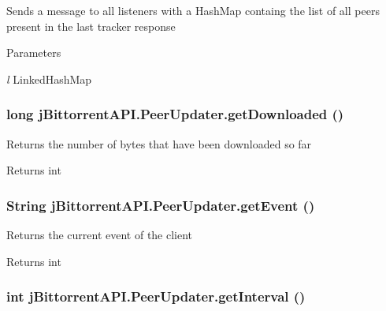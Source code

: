 \label{classj_bittorrent_a_p_i_1_1_peer_updater_a660e9bcab08ec687992ce4ae43a21078}
Sends a message to all listeners with a HashMap containg the list of all peers present in the last tracker response 
\begin{DoxyParams}{Parameters}
\item[{\em l}]LinkedHashMap \end{DoxyParams}
\hypertarget{classj_bittorrent_a_p_i_1_1_peer_updater_a191f9bf744b9ae2e5ff3a1b289d2a7e0}{
\subsubsection[{getDownloaded}]{\setlength{\rightskip}{0pt plus 5cm}long jBittorrentAPI.PeerUpdater.getDownloaded ()}}
\label{classj_bittorrent_a_p_i_1_1_peer_updater_a191f9bf744b9ae2e5ff3a1b289d2a7e0}
Returns the number of bytes that have been downloaded so far \begin{DoxyReturn}{Returns}
int 
\end{DoxyReturn}
\hypertarget{classj_bittorrent_a_p_i_1_1_peer_updater_a4d6807681ed998c8a118874a4ad96cfd}{
\subsubsection[{getEvent}]{\setlength{\rightskip}{0pt plus 5cm}String jBittorrentAPI.PeerUpdater.getEvent ()}}
\label{classj_bittorrent_a_p_i_1_1_peer_updater_a4d6807681ed998c8a118874a4ad96cfd}
Returns the current event of the client \begin{DoxyReturn}{Returns}
int 
\end{DoxyReturn}
\hypertarget{classj_bittorrent_a_p_i_1_1_peer_updater_a280462ebe5bef4985d1bc25f18ef6361}{
\subsubsection[{getInterval}]{\setlength{\rightskip}{0pt plus 5cm}int jBittorrentAPI.PeerUpdater.getInterval ()}}
\label{classj_bittorrent_a_p_i_1_1_peer_updater_a280462ebe5bef4985d1bc25f18ef6361}
